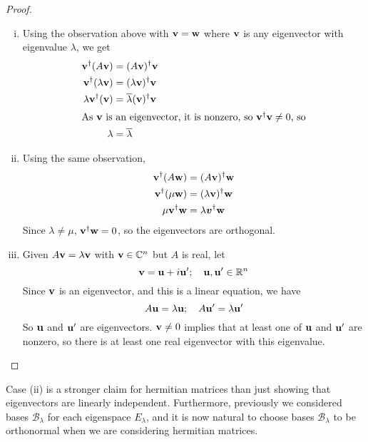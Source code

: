 \begin{proof}
	\begin{enumerate}[(i)]
		\item Using the observation above with \(\vb v = \vb w\) where \(\vb v\) is any eigenvector with eigenvalue \(\lambda\), we get
		      \begin{align*}
			      \vb v^\dagger (A\vb v)        & = (A\vb v)^\dagger \vb v                   \\
			      \vb v^\dagger (\lambda\vb v)  & = (\lambda\vb v)^\dagger \vb v             \\
			      \lambda \vb v^\dagger (\vb v) & = \overline{\lambda} (\vb v)^\dagger \vb v \\
			      \intertext{As \(\vb v\) is an eigenvector, it is nonzero, so \(\vb v^\dagger \vb v \neq 0\), so}
			      \lambda                       & = \overline \lambda
		      \end{align*}
		\item Using the same observation,
		      \begin{align*}
			      \vb v^\dagger (A \vb w)   & = (A \vb v)^\dagger \vb w       \\
			      \vb v^\dagger (\mu \vb w) & = (\lambda \vb v)^\dagger \vb w \\
			      \mu \vb v^\dagger \vb w   & = \lambda \bm v^\dagger \vb w
		      \end{align*}
		      Since \(\lambda \neq \mu\), \(\vb v^\dagger \vb w = 0\), so the eigenvectors are orthogonal.
		\item Given \(A\vb v = \lambda \vb v\) with \(\vb v \in \mathbb C^n\) but \(A\) is real, let
		      \[
			      \vb v = \vb u + i\vb u';\quad \vb u, \vb u' \in \mathbb R^n
		      \]
		      Since \(\vb v\) is an eigenvector, and this is a linear equation, we have
		      \[
			      A\vb u = \lambda \vb u;\quad A\vb u' = \lambda \vb u'
		      \]
		      So \(\vb u\) and \(\vb u'\) are eigenvectors.
		      \(\vb v \neq 0\) implies that at least one of \(\vb u\) and \(\vb u'\) are nonzero, so there is at least one real eigenvector with this eigenvalue.
	\end{enumerate}
\end{proof}
Case (ii) is a stronger claim for hermitian matrices than just showing that eigenvectors are linearly independent.
Furthermore, previously we considered bases \(\mathcal B_\lambda\) for each eigenspace \(E_\lambda\), and it is now natural to choose bases \(\mathcal B_\lambda\) to be orthonormal when we are considering hermitian matrices.
